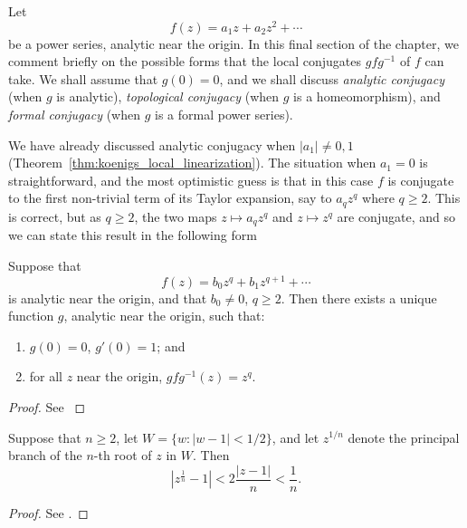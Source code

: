 Let
\begin{equation*}
    f(z) = a_1 z + a_2 z^2 + \cdots
\end{equation*}
be a power series, analytic near the origin. In this final section of the
chapter, we comment briefly on the possible forms that the local conjugates $g f
g^{-1}$ of $f$ can take. We shall assume that $g(0) = 0$, and we shall discuss
\emph{analytic conjugacy} (when $g$ is analytic), \emph{topological conjugacy}
(when $g$ is a homeomorphism), and \emph{formal conjugacy} (when $g$ is a formal
power series).

We have already discussed analytic conjugacy when $|a_1| \neq 0, 1$
(Theorem~\ref{thm:koenigs_local_linearization}). The situation when $a_1 = 0$ is
straightforward, and the most optimistic guess is that in this case $f$ is
conjugate to the first non-trivial term of its Taylor expansion, say to $a_q
z^q$ where $q \geq 2$. This is correct, but as $q \geq 2$, the two maps $z
\mapsto a_q z^q$ and $z \mapsto z^q$ are conjugate, and so we can state this
result in the following form

\begin{theorem}
    \label{thm:simple_local_analytic_conjugate_for_superattracting_fixed_point}
    Suppose that
    \begin{equation*}
        f(z) = b_0 z^q + b_1 z^{q+1} + \cdots
    \end{equation*}
    is analytic near the origin, and that $b_0 \neq 0$, $q \geq 2$. Then there
    exists a unique function $g$, analytic near the origin, such that:
    \begin{enumerate}[label=(\roman*)]
        \item $g(0) = 0$, $g'(0) = 1$; and
        \item for all $z$ near the origin, $g f g^{-1}(z) = z^q$.
    \end{enumerate}
\end{theorem}
\begin{proof}
    See \cite[151--152]{Beardon1991}
\end{proof}

\begin{lemma}
    Suppose that $n \geq 2$, let $W = \{w \colon |w-1| < 1/2\}$, and let
    $z^{1/n}$ denote the principal branch of the $n$-th root of $z$ in $W$. Then
    \begin{equation*}
        \left|z^{\frac{1}{n}} - 1\right| < 2\frac{|z - 1|}{n} < \frac{1}{n}.
    \end{equation*}
\end{lemma}
\begin{proof}
    See \cite[151]{Beardon1991}.
\end{proof}

